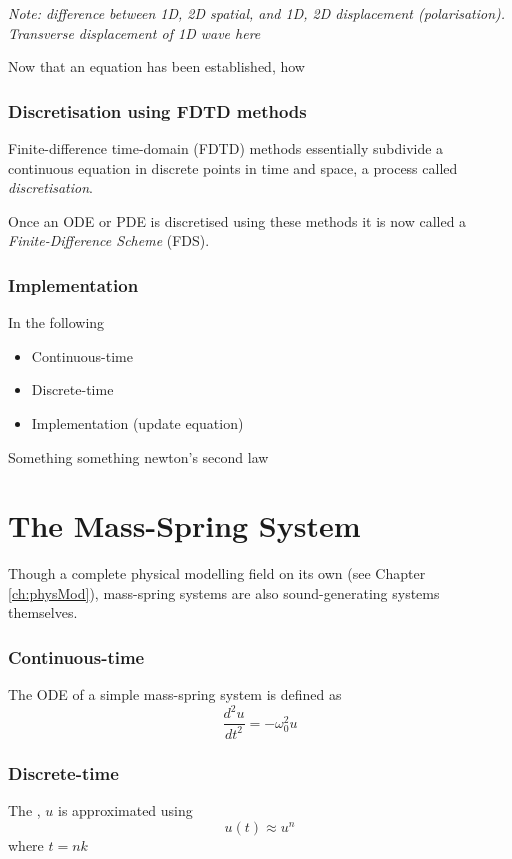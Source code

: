 \textit{Note: difference between 1D, 2D spatial, and 1D, 2D displacement (polarisation). Transverse displacement of 1D wave here }

Now that an equation has been established, how 


\subsubsection{Discretisation using FDTD methods}
Finite-difference time-domain (FDTD) methods essentially subdivide a continuous equation in discrete points in time and space, a process called \textit{discretisation}.

Once an ODE or PDE is discretised using these methods it is now called a \textit{Finite-Difference Scheme} (FDS).

\subsubsection{Implementation}



In the following 
\begin{itemize}
    \item Continuous-time
    \item Discrete-time
    \item Implementation (update equation)
\end{itemize}

Something something newton's second law

\section{%
The Mass-Spring System}
Though a complete physical modelling field on its own (see Chapter \ref{ch:physMod}), mass-spring systems are also sound-generating systems themselves.

\subsubsection{Continuous-time}
The ODE of a simple mass-spring system is defined as
\begin{equation}\label{eq:massSpringPDE}
    \frac{d^2u}{dt^2} = -\omega_0^2u
\end{equation}

\subsubsection{Discrete-time}
The , $u$ is approximated using 
\begin{equation}
    u(t) \approx u^n
\end{equation}
where $t = nk$

